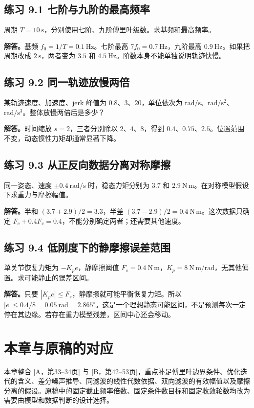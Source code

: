 \subsection*{练习 9.1 七阶与九阶的最高频率}
周期 $T=10\ \mathrm s$，分别使用七阶、九阶傅里叶级数。求基频和最高频率。

\textbf{解答。}基频 $f_0=1/T=0.1\ \mathrm{Hz}$。七阶最高 $7f_0=0.7\ \mathrm{Hz}$，九阶最高 $0.9\ \mathrm{Hz}$。如果把周期改成 $2\ \mathrm s$，两者变为 $3.5$ 和 $4.5\ \mathrm{Hz}$。阶数本身不能单独说明轨迹快慢。

\subsection*{练习 9.2 同一轨迹放慢两倍}
某轨迹速度、加速度、jerk 峰值为 $0.8$、$3$、$20$，单位依次为 $\mathrm{rad/s}$、$\mathrm{rad/s^2}$、$\mathrm{rad/s^3}$。整体放慢两倍后是多少？

\textbf{解答。}时间缩放 $s=2$，三者分别除以 $2$、$4$、$8$，得到 $0.4$、$0.75$、$2.5$。位置范围不变，动态惯性力矩却通常显著下降。

\subsection*{练习 9.3 从正反向数据分离对称摩擦}
同一姿态、速度 $\pm0.4\ \mathrm{rad/s}$ 时，稳态力矩分别为 $3.7$ 和 $2.9\ \mathrm{N\,m}$。在对称模型假设下求重力与摩擦幅值。

\textbf{解答。}半和 $(3.7+2.9)/2=3.3$，半差 $(3.7-2.9)/2=0.4\ \mathrm{N\,m}$。这次数据只确定 $F_c+0.4F_v=0.4$，不能分别确定两者；还需要其他速度。

\subsection*{练习 9.4 低刚度下的静摩擦误差范围}
单关节恢复力矩为 $-K_pe$，静摩擦阈值 $F_s=0.4\ \mathrm{N\,m}$，$K_p=8\ \mathrm{N\,m/rad}$，无其他偏置。求可能静止的误差区间。

\textbf{解答。}只要 $|K_pe|\le F_s$，静摩擦就可能平衡恢复力矩。所以 $|e|\le0.4/8=0.05\ \mathrm{rad}=2.865^\circ$。这是一个理想静态可能区间，不是预测每次一定停在其边缘。若存在重力模型残差，区间中心还会移动。

\section*{本章与原稿的对应}
本章整合 [A，第33--34页] 与 [B，第42--53页]，重点补足傅里叶边界条件、优化迭代的含义、差分噪声推导、同滤波的线性代数依据、双向滤波的有效幅值以及摩擦分离的假设。原稿中的固定截止频率倍数、固定条件数目标和固定收敛轮数均改为需要由模型和数据判断的设计选择。
